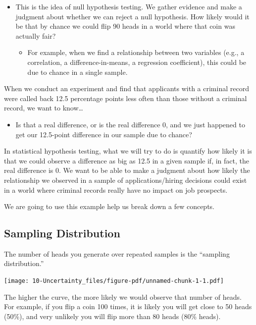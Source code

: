 \documentclass[
  letterpaper,
  DIV=11,
  numbers=noendperiod]{scrreprt}
\providecommand{\tightlist}{%
  \setlength{\itemsep}{0pt}\setlength{\parskip}{0pt}}\usepackage{longtable,booktabs,array}
\begin{document}
\begin{itemize}
\tightlist
\item
  This is the idea of null hypothesis testing. We gather evidence and
  make a judgment about whether we can reject a null hypothesis. How
  likely would it be that by chance we could flip 90 heads in a world
  where that coin was actually fair?

  \begin{itemize}
  \tightlist
  \item
    For example, when we find a relationship between two variables
    (e.g., a correlation, a difference-in-means, a regression
    coefficient), this could be due to chance in a single sample.
  \end{itemize}
\end{itemize}

When we conduct an experiment and find that applicants with a criminal
record were called back 12.5 percentage points less often than those
without a criminal record, we want to know\ldots{}

\begin{itemize}
\tightlist
\item
  Is that a real difference, or is the real difference 0, and we just
  happened to get our 12.5-point difference in our sample due to chance?
\end{itemize}

In statistical hypothesis testing, what we will try to do is quantify
how likely it is that we could observe a difference as big as 12.5 in a
given sample if, in fact, the real difference is 0. We want to be able
to make a judgment about how likely the relationship we observed in a
sample of applications/hiring decisions could exist in a world where
criminal records really have no impact on job prospects.

We are going to use this example help us break down a few concepts.

\hypertarget{sampling-distribution}{%
\subsection{Sampling Distribution}\label{sampling-distribution}}

The number of heads you generate over repeated samples is the ``sampling
distribution.''

\texttt{[image: 10-Uncertainty\_files/figure-pdf/unnamed-chunk-1-1.pdf]}

The higher the curve, the more likely we would observe that number of
heads. For example, if you flip a coin 100 times, it is likely you will
get close to 50 heads (50\%), and very unlikely you will flip more than
80 heads (80\% heads).
\end{document}
